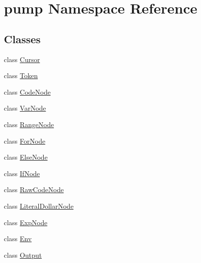 \hypertarget{namespacepump}{\section{pump Namespace Reference}
\label{namespacepump}
}
\subsection*{Classes}
\begin{DoxyCompactItemize}
\item 
class \hyperlink{classpump_1_1_cursor}{Cursor}
\item 
class \hyperlink{classpump_1_1_token}{Token}
\item 
class \hyperlink{classpump_1_1_code_node}{Code\-Node}
\item 
class \hyperlink{classpump_1_1_var_node}{Var\-Node}
\item 
class \hyperlink{classpump_1_1_range_node}{Range\-Node}
\item 
class \hyperlink{classpump_1_1_for_node}{For\-Node}
\item 
class \hyperlink{classpump_1_1_else_node}{Else\-Node}
\item 
class \hyperlink{classpump_1_1_if_node}{If\-Node}
\item 
class \hyperlink{classpump_1_1_raw_code_node}{Raw\-Code\-Node}
\item 
class \hyperlink{classpump_1_1_literal_dollar_node}{Literal\-Dollar\-Node}
\item 
class \hyperlink{classpump_1_1_exp_node}{Exp\-Node}
\item 
class \hyperlink{classpump_1_1_env}{Env}
\item 
class \hyperlink{classpump_1_1_output}{Output}
\end{DoxyCompactItemize}
